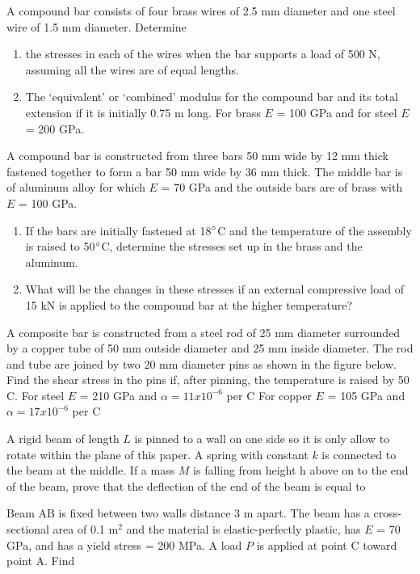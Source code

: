 \documentclass[
10pt,
a4paper,
openany,
svgnames,
]{book} %
\newcommand{\exercise}{%
\item\label{lab:\arabic{chapter}.\arabic{exercisesi}}  %
}
\begin{document}
\begin{exercises}

  \exercise A compound bar consists of four brass wires of 2.5 mm diameter and one steel wire of 1.5 mm diameter. Determine
  \begin{enumerate}
  \item the stresses in each of the wires when the bar supports a load of 500 N, assuming all the wires are of equal lengths.
  \item The ‘equivalent’ or ‘combined’ modulus for the compound bar and its total extension if it is initially 0.75 m long. 
    For brass $E$ = 100 GPa and for steel $E$ = 200 GPa.
  \end{enumerate}

  \exercise A compound bar is constructed from three bars 50 mm wide by 12 mm thick fastened together to form a bar 50 mm wide by 36 mm thick. The middle bar is of aluminum alloy for which $E$ = 70 GPa and the outside bars are of brass with $E$ = 100 GPa.
  \begin{enumerate}
  \item If the bars are initially fastened at 18$\degree$C and the temperature of the assembly is raised to 50$\degree$C, determine the stresses set up in the brass and the aluminum.
    
  \item What will be the changes in these stresses if an external compressive load of 15 kN is applied to the compound bar at the higher temperature?
  \end{enumerate}
    
  \exercise A composite bar is constructed from a steel rod of 25 mm diameter surrounded by a copper tube of 50 mm outside diameter and 25 mm inside diameter. The rod and tube are joined by two 20 mm diameter pins as shown in the figure below. Find the shear stress in the pins if, after pinning, the temperature is raised by 50 C.
  For steel $E$ = 210 GPa and $\alpha = 11 x 10^{-6}$ per C
  For copper $E$ = 105 GPa and $\alpha = 17 x 10^{-6}$ per C
  
  \exercise A rigid beam of length $L$ is pinned to a wall on one side so it is only allow to rotate within the plane of this paper. A spring with constant $k$ is connected to the beam at the middle. If a mass $M$ is falling from height h above on to the end of the beam, prove that the deflection of the end of the beam is equal to
  
  \exercise Beam AB is fixed between two walls distance 3 m apart. The beam has a cross-sectional area of 0.1 m$^2$ and the material is elastic-perfectly plastic, has $E$ = 70 GPa, and has a yield stress = 200 MPa. A load $P$ is applied at point C toward point A. Find
  

\end{exercises}
\end{document}
